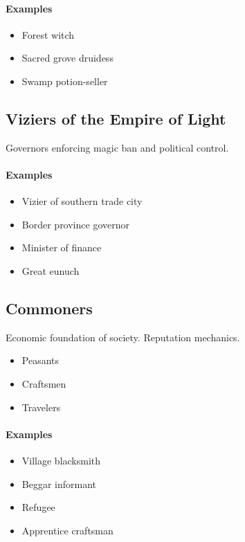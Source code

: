 \paragraph{Examples}
\begin{itemize}
\item Forest witch
\item Sacred grove druidess
\item Swamp potion-seller
\end{itemize}



\subsection{Viziers of the Empire of Light}

Governors enforcing magic ban and political control.

\paragraph{Examples}
\begin{itemize}
\item Vizier of southern trade city
\item Border province governor
\item Minister of finance
\item Great eunuch
\end{itemize}



\subsection{Commoners}

Economic foundation of society. Reputation mechanics.

\begin{itemize}
\item Peasants
\item Craftsmen
\item Travelers
\end{itemize}

\paragraph{Examples}
\begin{itemize}
\item Village blacksmith
\item Beggar informant
\item Refugee
\item Apprentice craftsman
\end{itemize}



